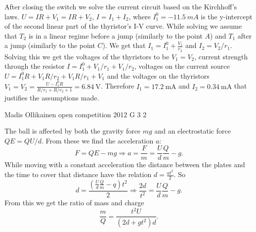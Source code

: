 \documentclass[11pt]{article}
\begin{document}
{\begin{figure}[h]
\begin{center}
\end{center}
\end{figure}

After closing the switch we solve the current circuit based on the Kirchhoff’s laws. $U = IR + V_1 = IR + V_2$, $I = I_1 + I_2$, where $I_1^0=\SI{-11.5}{mA}$ is the y-intercept of the second linear part of the thyristor’s I-V curve. While solving we assume that $T_2$ is in a linear regime before a jump (similarly to the point $A$) and $T_1$ after a jump (similarly to the point $C$). We get that $I_1 = I_1^0 + \frac{V_1}{r_2}$ and $I_2 = V_2/r_1$. Solving this we get the voltages of the thyristors to be $V_1 = V_2$, current strength through the resistor $I = I_1^0 + V_1/r_1 + V_1/r_2$, voltages on the current source $U = I_1^0R + V_1R/r_2 + V_1R/r_1 + V_1$ and the voltages on the thyristors $V_1 = V_2 = \frac{U - I_1^0R}{R/r_1 + R/r_2 + 1} = \SI{6.84}{\volt}$. Therefore $I_1 = \SI{17.2}{\milli\ampere}$ and $I_2 = \SI{0.34}{\milli\ampere}$ that justifies the assumptions made.
\fi
}

{Madis Ollikainen} %
{open competition} %
{2012} %
{G 3} %
{2} %
{

\ifEngSolution
The ball is affected by both the gravity force $mg$ and an electrostatic force $QE=QU/d$. From these we find the acceleration $a$:
\[ F = QE - mg \Rightarrow a = \frac{F}{m} = \frac{U}{d}\frac{Q}{m} - g. \]
While moving with a constant acceleration the distance between the plates and the time to cover that distance have the relation $ d = \frac{at^2}{2} $. So
\[ d = \frac{\left(\frac{U}{d}\frac{Q}{m} - q\right)t^2}{2} \Rightarrow \frac{2d}{t^2} = \frac{U}{d}\frac{Q}{m} - g. \] 
From this we get the ratio of mass and charge
\[ \frac{m}{Q} = \frac{t^2U}{\left(2d + gt^2\right)d}.  \]
\fi
}
\end{document}
